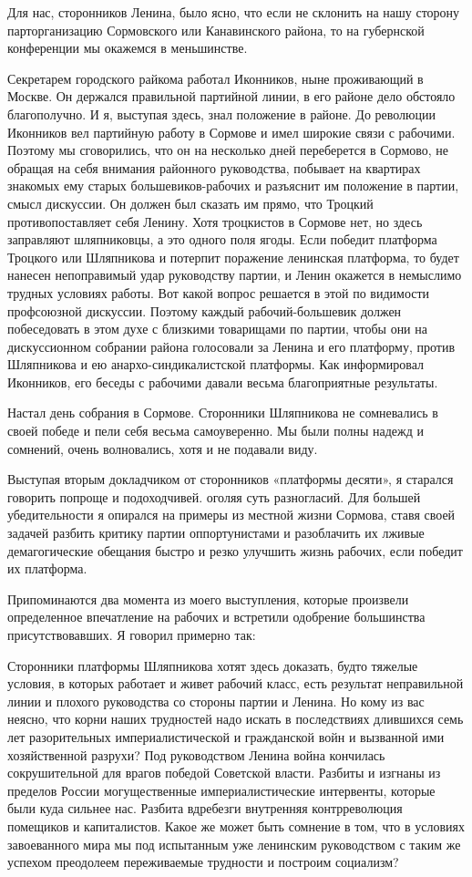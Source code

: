 \documentclass[12pt, a4paper, openany]{book}
\begin{document}
Для нас, сторонников Ленина, было ясно, что если не склонить на нашу сторону парторганизацию Сормовского или Канавинского района, то на губернской конференции мы окажемся в меньшинстве.

Секретарем городского райкома работал Иконников, ныне проживающий в Москве. Он держался правильной партийной линии, в его районе дело обстояло благополучно. И я, выступая здесь, знал положение в районе. До революции Иконников вел партийную работу в Сормове и имел широкие связи с рабочими. Поэтому мы сговорились, что он на несколько дней переберется в Сормово, не обращая на себя внимания районного руководства, побывает на квартирах знакомых ему старых большевиков-рабочих и разъяснит им положение в партии, смысл дискуссии. Он должен был сказать им прямо, что Троцкий противопоставляет себя Ленину. Хотя троцкистов в Сормове нет, но здесь заправляют шляпниковцы, а это одного поля ягоды. Если победит платформа Троцкого или Шляпникова и потерпит поражение ленинская платформа, то будет нанесен непоправимый удар руководству партии, и Ленин окажется в немыслимо трудных условиях работы. Вот какой вопрос решается в этой по видимости профсоюзной дискуссии. Поэтому каждый рабочий-большевик должен побеседовать в этом духе с близкими товарищами по партии, чтобы они на дискуссионном собрании района голосовали за Ленина и его платформу, против Шляпникова и ею анархо-синдикалистской платформы. Как информировал Иконников, его беседы с рабочими давали весьма благоприятные результаты.

Настал день собрания в Сормове. Сторонники Шляпникова не сомневались в своей победе и пели себя весьма самоуверенно. Мы были полны надежд и сомнений, очень волновались, хотя и не подавали виду.

Выступая вторым докладчиком от сторонников «платформы десяти», я старался говорить попроще и подоходчивей. оголяя суть разногласий. Для большей убедительности я опирался на примеры из местной жизни Сормова, ставя своей задачей разбить критику партии оппортунистами и разоблачить их лживые демагогические обещания быстро и резко улучшить жизнь рабочих, если победит их платформа.

Припоминаются два момента из моего выступления, которые произвели определенное впечатление на рабочих и встретили одобрение большинства присутствовавших. Я говорил примерно так:

Сторонники платформы Шляпникова хотят здесь доказать, будто тяжелые условия, в которых работает и живет рабочий класс, есть результат неправильной линии и плохого руководства со стороны партии и Ленина. Но кому из вас неясно, что корни наших трудностей надо искать в последствиях длившихся семь лет разорительных империалистической и гражданской войн и вызванной ими хозяйственной разрухи? Под руководством Ленина война кончилась сокрушительной для врагов победой Советской власти. Разбиты и изгнаны из пределов России могущественные империалистические интервенты, которые были куда сильнее нас. Разбита вдребезги внутренняя контрреволюция помещиков и капиталистов. Какое же может быть сомнение в том, что в условиях завоеванного мира мы под испытанным уже ленинским руководством с таким же успехом преодолеем переживаемые трудности и построим социализм?
\end{document}
